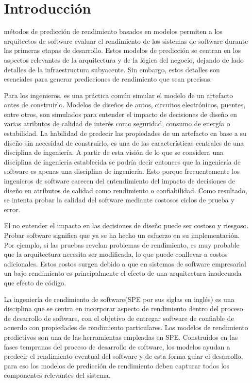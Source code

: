 \documentclass[conference]{IEEEtran}
\begin{document}
\section{Introducción}
 métodos de predicción de rendimiento basados en modelos permiten a los arquitectos de software evaluar el rendimiento de los sistemas de software durante las primeras etapas de desarrollo. Estos modelos de predicción se centran en los aspectos relevantes de la arquitectura y de la lógica del negocio, dejando de lado detalles de la infraestructura subyacente. Sin embargo, estos detalles son esenciales para generar predicciones de rendimiento que sean precisas.

Para los ingenieros, es una práctica común simular el modelo de un artefacto antes de construirlo. Modelos de diseños de autos, circuitos electrónicos, puentes, entre otros, son simulados para entender el impacto de decisiones de diseño en varias atributos de calidad de interés como seguridad, consumo de energía o estabilidad. La habilidad de predecir las propiedades de un artefacto en base a su diseño sin necesidad de construirlo, es una de las características centrales de una disciplina de ingeniería. A partir de esta visión de lo que se considera una disciplina de ingeniería establecida se podría decir entonces que la ingeniería de software es apenas una disciplina de ingeniería\cite{palladio-blue-book}. Esto porque frecuentemente los ingenieros de software carecen del entendimiento del impacto de decisiones de diseño en atributos de calidad como rendimiento o confiabilidad. Como resultado, se intenta probar la calidad del software mediante costosos ciclos de prueba y error.

El no entender el impacto en las decisiones de diseño puede ser costoso y riesgoso. Probar software significa que ya se ha hecho un esfuerzo en su implementación. Por ejemplo, si las pruebas revelan problemas de rendimiento, es muy probable que la arquitectura necesita ser modificada, lo que puede conllevar a costos adicionales. Estos costos surgen debido a que en sistemas de software empresarial un bajo rendimiento es principalmente el efecto de una arquitectura inadecuada que efecto de código.

La ingeniería de rendimiento de software(SPE por sus siglas en inglés) es una disciplina que se centra en incorporar aspecto de rendimiento dentro del proceso de desarrollo de software, con el objetivo de entregar software de confiable de acuerdo con propiedades de rendimiento particulares. Los modelos de rendimiento predictivos son una de las herramientas empleadas en SPE. Construidos en las fases tempranas del proceso de desarrollo de software, los modelos ayudan a predecir el rendimiento eventual del software y de esta forma guiar el desarrollo, para eso los modelos de predicción de rendimiento deben capturar todos los componentes relevantes del sistema.
\end{document}
